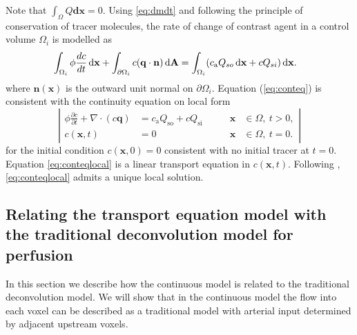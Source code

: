 \documentclass[final,5p,times,twocolumn]{elsarticle}
\begin{document}
	Note that $\int_\Omega Q  \mathbf{dx} = 0$. 
	Using \eqref{eq:dmdt} and following the principle of conservation of tracer molecules, the rate of change of contrast agent in a control volume $\Omega_i$ is modelled as
	\begin{align}
		& \int_{\Omega_i} \phi \frac{d c}{dt} \,\mathrm{d} \mathbf{x} + \int_{\partial \Omega_i}c(\mathbf{q} \cdot \mathbf{n}) \,\mathrm{d} \mathbf{A}
		 = \int_{\Omega_i}(c_\mathrm{a} Q_{so} \,\mathrm{d} \mathbf{x} + c Q_{si}) \,\mathrm{d} \mathbf{x}.
		\label{eq:conteq}
	\end{align}
	where $\mathbf{n}(\mathbf{x})$ is the outward unit normal on $\partial \Omega_i$.
	Equation (\ref{eq:conteq}) is consistent with the continuity equation on local form
	\begin{equation}
		\left\vert
		\begin{alignedat}{2}
			\phi \frac{\partial c}{\partial t} + \nabla \cdot (c\mathbf{q}) &= c_\mathrm{a}Q_{\mathrm{so}} + cQ_{\mathrm{si}} \qquad	&\mathbf{x} &\in \Omega, \ t>0,  \\
			c(\mathbf{x},t) &= 0 																			 	&\mathbf{x} &\in \Omega, \ t=0.
		\end{alignedat}
		\right\vert
		\label{eq:conteqlocal}
	\end{equation}
	for the initial condition $c(\mathbf{x},0) = 0$ consistent with no initial tracer at $t = 0$.
	Equation \eqref{eq:conteqlocal} is a linear transport equation in $c(\mathbf{x},t)$. 
	Following \cite{evans98}, \eqref{eq:conteqlocal} admits a unique local solution.


\subsection{Relating the transport equation model with the traditional deconvolution model for perfusion}\label{sec:NewAndOld}
	In this section we describe how the continuous model is related to the traditional deconvolution model.
	We will show that in the continuous model the flow into each voxel can be described as a traditional model with arterial input determined by adjacent upstream voxels.
\end{document}
